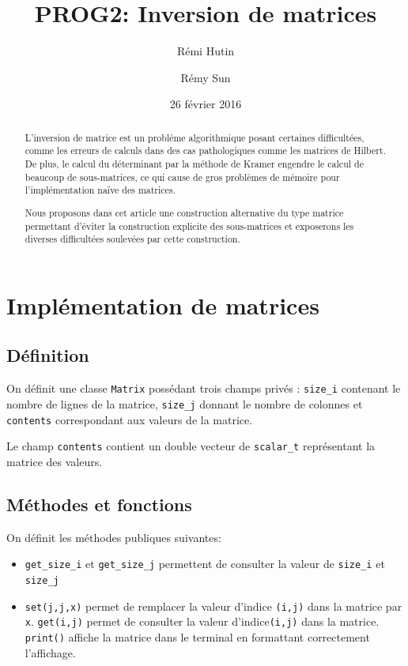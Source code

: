 \documentclass[a4paper,11pt]{article}
\title{PROG2: Inversion de matrices}
\author{Rémi Hutin \and Rémy Sun}
\date{26 février 2016}
\begin{document}
\maketitle

\begin{abstract}
  L'inversion de matrice est un probléme algorithmique posant certaines difficultées, comme les erreurs de calculs dans des cas pathologiques comme les matrices de Hilbert.
  De plus, le calcul du déterminant par la méthode de Kramer engendre le calcul de beaucoup de sous-matrices, ce qui cause de gros problèmes de mémoire pour l'implémentation naïve des matrices.

  Nous proposons dans cet article une construction alternative du type matrice permettant d'éviter la construction explicite des sous-matrices et exposerons les diverses difficultées soulevées par cette construction.
\end{abstract}

\section{Implémentation de matrices}

\subsection{Définition}

On définit une classe \texttt{Matrix} possédant trois champs privés : \texttt{size\_i} contenant le nombre de lignes de la matrice, \texttt{size\_j} donnant le nombre de colonnes et
 \texttt{contents} correspondant aux valeurs de la matrice.

Le champ  \texttt{contents}  contient un double vecteur de \texttt{scalar\_t} représentant la matrice des valeurs.

\subsection{Méthodes et fonctions}

On définit les méthodes publiques suivantes:

\begin{itemize}
\item \texttt{get\_size\_i} et \texttt{get\_size\_j} permettent de consulter la valeur de \texttt{size\_i} et \texttt{size\_j}
\item \texttt{set(j,j,x)} permet de remplacer la valeur d'indice \texttt{(i,j)} dans la matrice par \texttt{x}. \texttt{get(i,j)} permet de consulter la valeur d'indice\texttt{(i,j)} dans la matrice. \texttt{print()} affiche la matrice dans le terminal en formattant correctement l'affichage.
\end{itemize}
\end{document}
